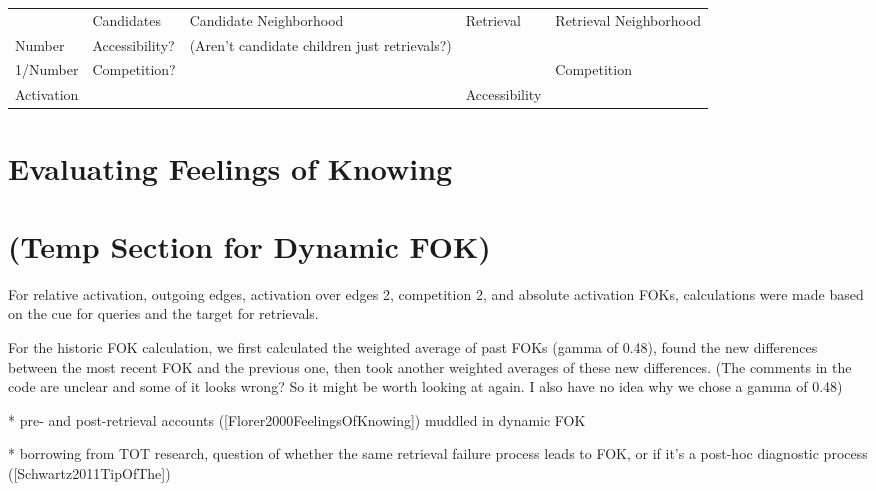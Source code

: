 \documentclass[10pt,letterpaper]{article}
\begin{document}
\begin{table*}[ht]
\begin{tabular}{lllll}
                                & Candidates               & Candidate Neighborhood             & Retrieval                                & Retrieval Neighborhood       \\ \cline{2-5} 
\multicolumn{1}{l|}{Number}     & \multicolumn{1}{l|}{Accessibility?} & \multicolumn{1}{l|}{(Aren't candidate children just retrievals?)} & \multicolumn{1}{l|}{\cellcolor{gray!70}}       & \multicolumn{1}{l|}{} \\ \cline{2-5} 
\multicolumn{1}{l|}{1/Number}   & \multicolumn{1}{l|}{Competition?} & \multicolumn{1}{l|}{} & \multicolumn{1}{l|}{\cellcolor{gray!70}}       & \multicolumn{1}{l|}{Competition} \\ \cline{2-5} 
\multicolumn{1}{l|}{Activation} & \multicolumn{1}{l|}{} & \multicolumn{1}{l|}{} & \multicolumn{1}{l|}{Accessibility} & \multicolumn{1}{l|}{} \\ \cline{2-5} 
\end{tabular}
\end{table*}

		
\section{Evaluating Feelings of Knowing}

\section{(Temp Section for Dynamic FOK)}

For relative activation, outgoing edges, activation over edges 2,  competition 2, and absolute activation FOKs, calculations were made based on the cue for queries and the target for retrievals.

For the historic FOK calculation, we first calculated the weighted average of past FOKs (gamma of 0.48), found the new differences between the most recent FOK and the previous one, then took another weighted averages of these new differences. (The comments in the code are unclear and some of it looks wrong? So it might be worth looking at again. I also have no idea why we chose a gamma of 0.48)

* pre- and post-retrieval accounts ([Florer2000FeelingsOfKnowing]) muddled in dynamic FOK


    * borrowing from TOT research, question of whether the same retrieval failure process leads to FOK, or if it's a post-hoc diagnostic process ([Schwartz2011TipOfThe])
   
\end{document}
